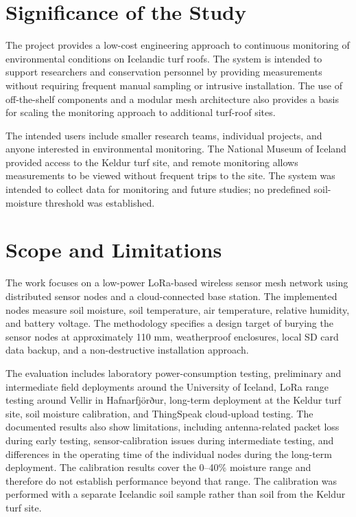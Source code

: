 \section{Significance of the Study}
The project provides a low-cost engineering approach to continuous monitoring of environmental conditions on Icelandic turf roofs. The system is intended to support researchers and conservation personnel by providing measurements without requiring frequent manual sampling or intrusive installation. The use of off-the-shelf components and a modular mesh architecture also provides a basis for scaling the monitoring approach to additional turf-roof sites.

The intended users include smaller research teams, individual projects, and anyone interested in environmental monitoring. The National Museum of Iceland provided access to the Keldur turf site, and remote monitoring allows measurements to be viewed without frequent trips to the site. The system was intended to collect data for monitoring and future studies; no predefined soil-moisture threshold was established.

\section{Scope and Limitations}
The work focuses on a low-power LoRa-based wireless sensor mesh network using distributed sensor nodes and a cloud-connected base station. The implemented nodes measure soil moisture, soil temperature, air temperature, relative humidity, and battery voltage. The methodology specifies a design target of burying the sensor nodes at approximately 110 mm, weatherproof enclosures, local SD card data backup, and a non-destructive installation approach.

The evaluation includes laboratory power-consumption testing, preliminary and intermediate field deployments around the University of Iceland, LoRa range testing around Vellir in Hafnarfjörður, long-term deployment at the Keldur turf site, soil moisture calibration, and ThingSpeak cloud-upload testing. The documented results also show limitations, including antenna-related packet loss during early testing, sensor-calibration issues during intermediate testing, and differences in the operating time of the individual nodes during the long-term deployment. The calibration results cover the 0--40\% moisture range and therefore do not establish performance beyond that range. The calibration was performed with a separate Icelandic soil sample rather than soil from the Keldur turf site.